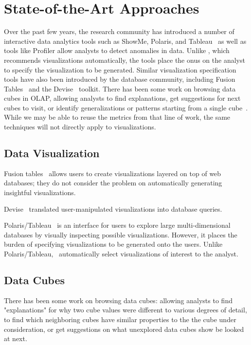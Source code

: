 \section{State-of-the-Art Approaches}
\label{sec:related_work}

Over the past few years, the research community has introduced 
a number of interactive data analytics tools such as ShowMe, Polaris, and
Tableau~\cite{DBLP:journals/cacm/StolteTH08, DBLP:journals/tvcg/MackinlayHS07}
as well as tools like Profiler allow analysts to detect anomalies in data.
Unlike \SeeDB, which recommends visualizations automatically, the tools place the
onus on the analyst to specify the visualization to be generated.
Similar visualization specification tools have also been introduced
by the database community, including Fusion Tables~\cite{DBLP:conf/sigmod/GonzalezHJLMSSG10} 
and the Devise~\cite{DBLP:conf/sigmod/LivnyRBCDLMW97} toolkit.
There has been some work on browsing data cubes in OLAP, allowing
analysts to find explanations, get suggestions for next cubes to visit,
or identify generalizations or patterns starting from a single cube~\cite{DBLP:conf/vldb/Sarawagi99, 
DBLP:conf/vldb/SatheS01, DBLP:conf/vldb/Sarawagi00}. 
While we may be able to reuse the metrics from that line of work,
the same techniques will not directly apply to visualizations.

\subsection{Data Visualization}

Fusion tables~\cite{} allows users to create visualizations layered on top of web databases; they do not consider the problem on automatically generating insightful visualizations. 

Devise~\cite{devise} translated user-manipulated visualizations into database queries. 


Polaris/Tableau~\cite{tableau} is an interface for users to explore large multi-dimensional databases by visually inspecting possible visualizations. However, it places the burden of specifying visualizations to be generated onto the users. Unlike Polaris/Tableau, \SeeDB\ automatically select visualizations of interest to the analyst.

\subsection{Data Cubes}

There has been some work on browsing data cubes: allowing analysts to find "explanations" for why two cube values were different to various degrees of detail, to find which neighboring cubes have similar properties to the the cube under consideration, or get suggestions on what unexplored data cubes show be looked at next. 


